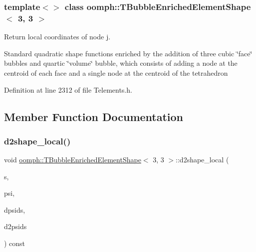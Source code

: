 \subsubsection*{template$<$$>$\newline
class oomph\+::\+T\+Bubble\+Enriched\+Element\+Shape$<$ 3, 3 $>$}

Return local coordinates of node j. 

Standard quadratic shape functions enriched by the addition of three cubic \char`\"{}face\char`\"{} bubbles and quartic \char`\"{}volume\char`\"{} bubble, which consists of adding a node at the centroid of each face and a single node at the centroid of the tetrahedron 

Definition at line 2312 of file Telements.\+h.



\subsection{Member Function Documentation}
\mbox{\label{classoomph_1_1TBubbleEnrichedElementShape_3_013_00_013_01_4_a6e43bca8652e876e0f0642934264f119}} 
\subsubsection{\texorpdfstring{d2shape\+\_\+local()}{d2shape\_local()}}
{\footnotesize\ttfamily void \hyperlink{classoomph_1_1TBubbleEnrichedElementShape}{oomph\+::\+T\+Bubble\+Enriched\+Element\+Shape}$<$ 3, 3 $>$\+::d2shape\+\_\+local (\begin{DoxyParamCaption}\item[{const \hyperlink{classoomph_1_1Vector}{Vector}$<$ double $>$ \&}]{s,  }\item[{\hyperlink{classoomph_1_1Shape}{Shape} \&}]{psi,  }\item[{\hyperlink{classoomph_1_1DShape}{D\+Shape} \&}]{dpsids,  }\item[{\hyperlink{classoomph_1_1DShape}{D\+Shape} \&}]{d2psids }\end{DoxyParamCaption}) const\hspace{0.3cm}{\ttfamily [inline]}}


